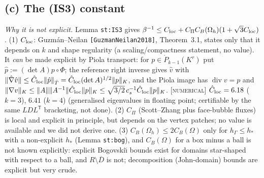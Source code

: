 \documentclass[11pt,reqno]{amsart}
\theoremstyle{plain}
\theoremstyle{definition}
\newcommand{\status}[1]{\textup{\textsc{[#1]}}}
\newcommand{\hG}{h_\Gamma}
\newcommand{\Oh}{\Omega_h}
\newcommand{\norm}[1]{\lVert #1\rVert}
\renewcommand{\div}{\operatorname{div}}
\begin{document}
\subsection{(c) The (IS3) constant}
\emph{Why it is not explicit.} Lemma \texttt{st:IS3} gives $\beta^{-1}\le C_{\rm loc}+C_\Pi C_B(\Oh)(1+\sqrt3C_{\rm loc})$.
(1) $C_{\rm loc}$: Guzm\'an--Neilan \texttt{[GuzmanNeilan2018]}, Theorem~3.1, states only that it depends on $k$ and shape regularity (a scaling/compactness statement, no value). It \emph{can} be made explicit by Piola transport: for $p\in\mathring P_{k-1}(K^r)$ put $\hat p:=(\det A)p\circ\Phi$; the reference right inverse gives $\hat v$ with $\norm{\hat\nabla\hat v}\le\hat C_{\rm loc}\norm{\hat p}_{\hat T}=\hat C_{\rm loc}(\det A)^{1/2}\norm p_K$, and the Piola image has $\div v=p$ and $\norm{\nabla v}_K\le\norm A\norm{A^{-1}}\hat C_{\rm loc}\norm p_K\le\sqrt{3/2}\,c_s^{-1}\hat C_{\rm loc}\norm p_K$. \status{numerical} $\hat C_{\rm loc}=6.18$ ($k=3$), $6.41$ ($k=4$) (generalised eigenvalues in floating point; certifiable by the same $LDL^{\mathsf T}$ bracketing, not done).
(2) $C_\Pi$ (Scott--Zhang plus face-bubble fluxes) is local and explicit in principle, but depends on the vertex patches; no value is available and we did not derive one.
(3) $C_B(\Oh)\le2C_B(\Omega)$ only for $\hG\le h_\ast$ with a non-explicit $h_\ast$ (Lemma \texttt{st:bog}), and $C_B(\Omega)$ for a box minus a ball is not known explicitly: explicit Bogovski\u{\i} bounds exist for domains star-shaped with respect to a ball, and $R\setminus\overline D$ is not; decomposition (John-domain) bounds are explicit but very crude.
\end{document}
